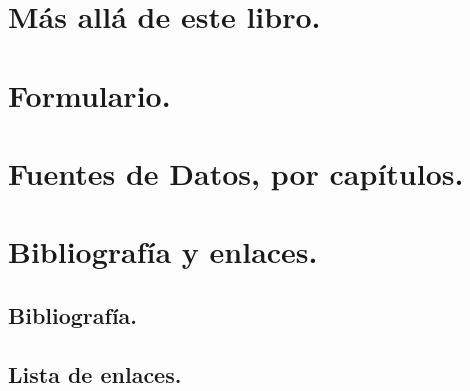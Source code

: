 \documentclass[10pt,a4paper]{book}
\begin{document}
\chapter{Más allá de este libro.}
\label{apendice:MasAlla}



\chapter{Formulario.}
\label{apendice:Tablas}
\newpage


\newpage
\chapter{Fuentes de Datos, por capítulos.}
\label{apendice:FuentesDatos}


\chapter{Bibliografía y enlaces.}\label{apendice:comentarioBibliografia}


%

\section{Bibliografía.}\label{bibliografia}


\section{Lista de enlaces.}


\backmatter

\printindex

\pagebreak
\thispagestyle{empty}
\mbox{}

\newpage
\thispagestyle{empty}
\mbox{  }
\end{document}
